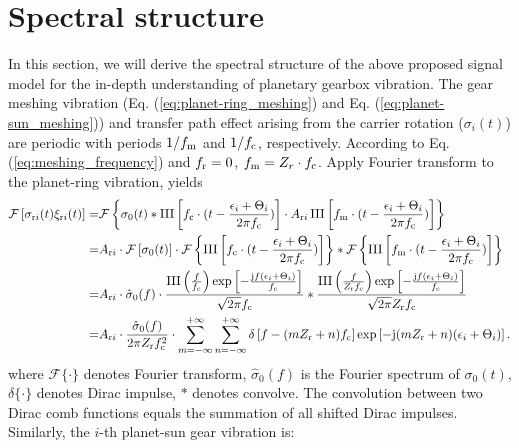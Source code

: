 \documentclass[a4paper,fleqn]{cas-sc}%
\begin{document}
\section{Spectral structure}
\par In this section, we will derive the spectral structure of the above proposed signal model for the in-depth understanding of planetary gearbox vibration. The gear meshing vibration (Eq. (\ref{eq:planet-ring_meshing}) and Eq. (\ref{eq:planet-sun_meshing})) and transfer path effect arising from the carrier rotation ($\sigma_{i}(t)$) are periodic with periods $1/f_{\rm m}$ and $1/f_{\rm c}$, respectively. According to Eq. (\ref{eq:meshing_frequency}) and $f_{\rm r}=0$, $f_{\rm m}=Z_{r} \cdot f_{\rm c}$. Apply Fourier transform to the planet-ring vibration, yields
\begin{equation}
\begin{split}
    \mathcal{F}\left[ \sigma_{{\rm r}i}(t) \xi_{{\rm r}i}(t) \right]=&\mathcal{F}\left\{\sigma_0(t) \ast \operatorname{III}\left[f_{\rm c} \cdot (t - \frac{\epsilon_i+\Theta_i}{2 \pi f_{\rm c}})\right] \cdot A_{{\rm r}i}\operatorname{III}\left[f_{\rm m} \cdot (t-\frac{\epsilon_i+\Theta_i}{2 \pi f_{\rm c}})\right]\right\}\\
    =&A_{{\rm r}i} \cdot \mathcal{F}\left[\sigma_0(t)\right] \cdot \mathcal{F}\left\{\operatorname{III}\left[f_{\rm c} \cdot (t - \frac{\epsilon_i+\Theta_i}{2 \pi f_{\rm c}})\right] \right\}
    \ast \mathcal{F}\left\{ \operatorname{III}\left[f_{\rm m} \cdot (t-\frac{\epsilon_i+\Theta_i}{2 \pi f_{\rm c}})\right] \right\}\\
=&A_{{\rm r}i} \cdot \hat{\sigma}_0(f) \cdot \frac{\operatorname{III}\left(\frac{f}{f_{\rm c}}\right) \exp\left[-\frac{{\rm j} f (\epsilon_i+\Theta_i)}{f_{\rm c}}\right]}{\sqrt{2 \pi} f_{\rm c}} \ast \frac{\operatorname{III}\left(\frac{f}{ Z_{\rm r} f_{\rm c}}\right) \exp\left[-\frac{{\rm j} f (\epsilon_i+\Theta_i)}{ f_{\rm c}}\right]}{\sqrt{2 \pi } Z_{\rm r}f_{\rm c}}\\
=&A_{{\rm r}i} \cdot \frac{\hat{\sigma}_0(f)}{2 \pi Z_{\rm r} f_{\rm c}^{2}} \cdot \sum_{m=-\infty}^{+\infty} \sum_{n=-\infty}^{+\infty} \delta\left[f-(mZ_{\rm r}+n)f_{\rm c}\right] \exp\left[-{\rm j}(m Z_{\rm r}+n)(\epsilon_i+\Theta_i)\right].
\end{split}
\end{equation}
where $\mathcal{F}\{\cdot\}$ denotes Fourier transform, $\hat{\sigma}_0(f)$ is the Fourier spectrum of $\sigma_0(t)$, $\delta\{\cdot\}$ denotes Dirac impulse, $\ast$ denotes convolve. The convolution between two Dirac comb functions equals the summation of all shifted Dirac impulses. Similarly,  the $i$-th planet-sun gear vibration is:
\end{document}
